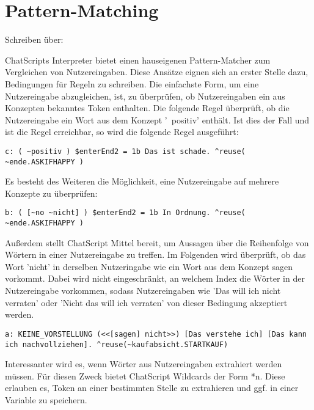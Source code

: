 \section{Pattern-Matching}
\label{sec:ChatScript: Pattern-Matching}

\textcolor[rgb]{1,0.41,0.13}{Schreiben über:}

ChatScripts Interpreter bietet einen hauseigenen Pattern-Matcher zum Vergleichen von Nutzereingaben. Diese Ansätze eignen sich an erster Stelle dazu, Bedingungen für Regeln zu schreiben. Die einfachste Form, um eine Nutzereingabe abzugleichen, ist, zu überprüfen, ob Nutzereingaben ein aus Konzepten bekanntes Token enthalten. Die folgende Regel überprüft, ob die Nutzereingabe ein Wort aus dem Konzept '~positiv' enthält. Ist dies der Fall und ist die Regel erreichbar, so wird die folgende Regel ausgeführt:

\begin{lstlisting}[caption={Regel in kaufabsicht.top}]
c: ( ~positiv ) $enterEnd2 = 1b Das ist schade. ^reuse( ~ende.ASKIFHAPPY )
\end{lstlisting}

Es besteht des Weiteren die Möglichkeit, eine Nutzereingabe auf mehrere Konzepte zu überprüfen: 

\begin{lstlisting}[caption={Regel in kaufabsicht.top}]
b: ( [~no ~nicht] ) $enterEnd2 = 1b In Ordnung. ^reuse( ~ende.ASKIFHAPPY )
\end{lstlisting}

Außerdem stellt ChatScript Mittel bereit, um Aussagen über die Reihenfolge von Wörtern in einer Nutzereingabe zu treffen. Im Folgenden wird überprüft, ob das Wort 'nicht' in derselben Nutzeringabe wie ein Wort aus dem Konzept sagen vorkommt. Dabei wird nicht eingeschränkt, an welchem Index die Wörter in der Nutzereingabe vorkommen, sodass Nutzereingaben wie 'Das will ich nicht verraten' oder 'Nicht das will ich verraten' von dieser Bedingung akzeptiert werden. 

\begin{lstlisting}[caption={Regel KEINE\_VORSTELLUNG in introductions.top}]
a: KEINE_VORSTELLUNG (<<[sagen] nicht>>) [Das verstehe ich] [Das kann ich nachvollziehen]. ^reuse(~kaufabsicht.STARTKAUF)
\end{lstlisting}

Interessanter wird es, wenn Wörter aus Nutzereingaben extrahiert werden müssen. Für diesen Zweck bietet ChatScript Wildcards der Form *n. Diese erlauben es, Token an einer bestimmten Stelle zu extrahieren und ggf. in einer Variable zu speichern. 

